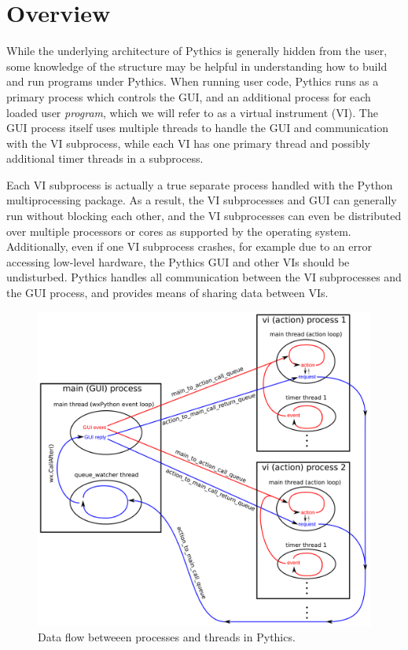 \documentclass[letterpaper,10pt,english]{sphinxmanual}
\begin{document}
\section{Overview}
\label{programming:overview}
While the underlying architecture of Pythics is generally hidden from the user,
some knowledge of the structure may be helpful in understanding how to build and
run programs under Pythics. When running user code, Pythics runs as a primary
process which controls the GUI, and an additional process for each loaded user
\emph{program}, which we will refer to as a virtual instrument (VI). The GUI process
itself uses multiple threads to handle the GUI and communication with the VI
subprocess, while each VI has one primary thread and possibly additional timer
threads in a subprocess.

Each VI subprocess is actually a true separate process handled with the Python
multiprocessing package. As a result, the VI subprocesses and GUI can generally
run without blocking each other, and the VI subprocesses can even be
distributed over multiple processors or cores as supported by the operating
system. Additionally, even if one VI subprocess crashes, for example due to an
error accessing low-level hardware, the Pythics GUI and other VIs should be
undisturbed. Pythics handles all communication between the VI subprocesses and
the GUI process, and provides means of sharing data between VIs.
\begin{figure}[htbp]
\centering
\capstart

\includegraphics[width=0.800\linewidth]{process_diagram.png}
\caption{Data flow betweeen processes and threads in Pythics.}\end{figure}
\end{document}
